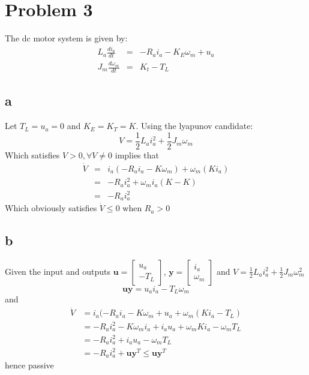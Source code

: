 \documentclass[11pt]{article}
\begin{document}
\section*{Problem 3}
The dc motor system is given by:
\begin{eqnarray*}
L_a \frac{d i_a}{dt} &=& -R_a i_a - K_E \omega_m + u_a \\
J_m \frac{d \omega_m}{dt} &=& K_t - T_L
\end{eqnarray*}
\subsection*{a}
Let $T_L = u_a = 0$ and $K_E = K_T = K$. Using the lyapunov candidate:
\[V = \frac{1}{2} L_a i_a^2 + \frac{1}{2} J_m \omega_m\]
Which satisfies $V > 0, \forall V \not = 0$ implies that
\begin{eqnarray*}
\dot{V} &=& i_a(-R_a i_a - K \omega_m) + \omega_m(K i_a) \\
&=& -R_a i_a^2 + \omega_m i_a (K - K) \\
&=& -R_a i_a^2
\end{eqnarray*}
Which obviously satisfies $\dot{V} \leq 0$ when $R_a > 0$

\subsection*{b}
Given the input and outputs $\mathbf{u} = \begin{bmatrix} u_a \\ -T_L \end{bmatrix}$, $\mathbf{y} = \begin{bmatrix} i_a \\ \omega_m \end{bmatrix}$ and $V = \frac{1}{2} L_a i_a^2 + \frac{1}{2} J_m \omega_m^2$
\[\mathbf{u} \mathbf{y} = u_a i_a - T_L \omega_m\]
and
\begin{eqnarray*}
\dot{V} &= i_a(-R_a i_a - K \omega_m + u_a + \omega_m ( K i_a - T_L) \\
&= - R_a i_a^2 - K \omega_m i_a + i_a u_a + \omega_m K i_a - \omega_m T_L \\
&= - R_a i_a^2 + i_a u_a - \omega_m T_L \\
&= - R_a i_a^2 + \mathbf{u} \mathbf{y}^T \leq \mathbf{u} \mathbf{y}^T
\end{eqnarray*}
hence passive
\end{document}
